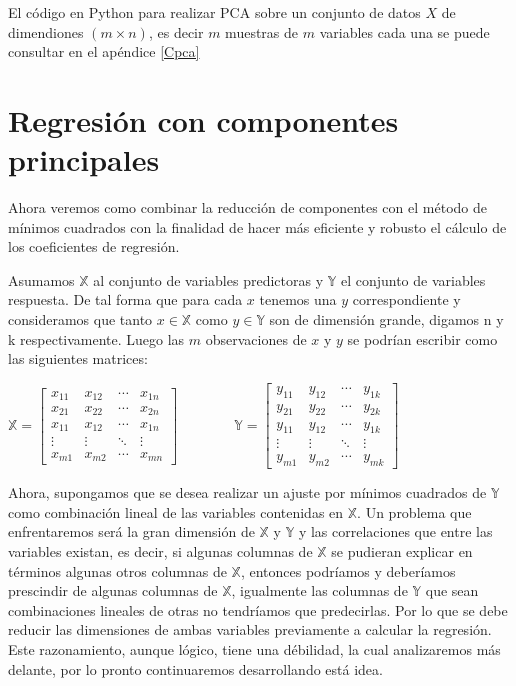 El código en Python para realizar PCA sobre un conjunto de datos $X$ de dimendiones $(m \times n)$, es decir $m$ muestras de $m$ variables cada una se puede consultar en el apéndice \ref{Cpca} 

\section{Regresión con componentes principales}

Ahora veremos como combinar la reducción de componentes con el método de mínimos cuadrados con la finalidad de hacer más eficiente y robusto el cálculo de los coeficientes de regresión. 

Asumamos $\mathbb{X}$ al conjunto de variables predictoras y $\mathbb{Y}$ el conjunto de variables respuesta. De tal forma que para cada $x$ tenemos una $y$ correspondiente y consideramos que tanto $x \in \mathbb{X}$ como $y \in \mathbb{Y}$ son de dimensión grande, digamos n y k respectivamente. Luego las $m$ observaciones de $x$ y $y$ se podrían escribir como las siguientes matrices: 

$
\mathbb{X} =
\begin{bmatrix}
 x_{11} & x_{12} & \cdots & x_{1n} \\
 x_{21} & x_{22} & \cdots & x_{2n} \\
 x_{11} & x_{12} & \cdots & x_{1n} \\
 \vdots & \vdots & \ddots & \vdots \\
 x_{m1} & x_{m2} & \cdots & x_{mn}	
\end{bmatrix} 
\qquad\qquad
\mathbb{Y} =
\begin{bmatrix}
 y_{11} & y_{12} & \cdots & y_{1k} \\
 y_{21} & y_{22} & \cdots & y_{2k} \\
 y_{11} & y_{12} & \cdots & y_{1k} \\
 \vdots & \vdots & \ddots & \vdots \\
 y_{m1} & y_{m2} & \cdots & y_{mk}	
\end{bmatrix} $ 
 
Ahora, supongamos que se desea realizar un ajuste por mínimos cuadrados de $\mathbb{Y}$ como combinación lineal de las variables contenidas en $\mathbb{X}$. Un problema que enfrentaremos será la gran dimensión de $\mathbb{X}$ y $\mathbb{Y}$ y las correlaciones que entre las variables existan, es decir, si algunas columnas de $\mathbb{X}$ se pudieran explicar en términos algunas otros columnas de $\mathbb{X}$, entonces podríamos y deberíamos prescindir de algunas columnas de $\mathbb{X}$, igualmente las columnas de $\mathbb{Y}$ que sean combinaciones lineales de otras no tendríamos que predecirlas. Por lo que se debe reducir las dimensiones de ambas variables previamente a calcular la regresión. Este razonamiento, aunque lógico, tiene una débilidad, la cual analizaremos más delante, por lo pronto continuaremos desarrollando está idea. 

